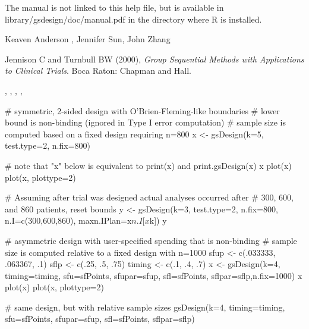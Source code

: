 \begin{Note}\relax
The manual is not linked to this help file, but is available in library/gsdesign/doc/manual.pdf
in the directory where R is installed.
\end{Note}
\begin{Author}\relax
Keaven Anderson , Jennifer Sun, John Zhang
\end{Author}
\begin{References}\relax
Jennison C and Turnbull BW (2000), \emph{Group Sequential Methods with Applications to Clinical Trials}.
Boca Raton: Chapman and Hall.
\end{References}
\begin{SeeAlso}\relax
{}, , , 
, 
\end{SeeAlso}
\begin{Examples}
\begin{ExampleCode}
#  symmetric, 2-sided design with O'Brien-Fleming-like boundaries
#  lower bound is non-binding (ignored in Type I error computation)
#  sample size is computed based on a fixed design requiring n=800
x <- gsDesign(k=5, test.type=2, n.fix=800)

# note that "x" below is equivalent to print(x) and print.gsDesign(x)
x
plot(x)
plot(x, plottype=2)

# Assuming after trial was designed actual analyses occurred after
# 300, 600, and 860 patients, reset bounds 
y <- gsDesign(k=3, test.type=2, n.fix=800, n.I=c(300,600,860),
   maxn.IPlan=x$n.I[x$k])
y

#  asymmetric design with user-specified spending that is non-binding
#  sample size is computed relative to a fixed design with n=1000
sfup <- c(.033333, .063367, .1)
sflp <- c(.25, .5, .75)
timing <- c(.1, .4, .7)
x <- gsDesign(k=4, timing=timing, sfu=sfPoints, sfupar=sfup, sfl=sfPoints,
                    sflpar=sflp,n.fix=1000) 
x
plot(x)
plot(x, plottype=2)

# same design, but with relative sample sizes
gsDesign(k=4, timing=timing, sfu=sfPoints, sfupar=sfup, sfl=sfPoints, sflpar=sflp)
\end{ExampleCode}
\end{Examples}

